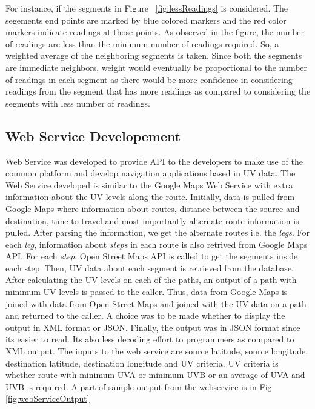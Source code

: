 \documentclass[12pt,fullpage,doublespace]{article}
\begin{document}
For instance, if the segments in Figure ~\ref{fig:lessReadings} is considered. The segements end points are marked by blue colored markers and the red color markers indicate readings at those points. As observed in the figure, the number of readings are less than the minimum number of readings required. So, a weighted average of the neighboring segments is taken. Since both the segments are immediate neighbors, weight would eventually be proportional to the number of readings in each segment as there would be more confidence in considering readings from the segment that has more readings as compared to considering the segments with less number of readings. 

\newpage
\subsection{Web Service Developement}
Web Service was developed to provide API to the developers to make use of the common platform and develop navigation applications based in UV data. The Web Service developed is similar to the Google Maps Web Service \cite{googleWebService} with extra information about the UV levels along the route. Initially, data is pulled from Google Maps where information about routes, distance between the source and destination, time to travel and most importantly alternate route information is pulled. After parsing the information, we get the alternate routes i.e. the {\it legs}. For each {\it leg}, information about {\it steps} in each route is also retrived from Google Maps API. For each {\it step}, Open Street Maps API is called to get the segments inside each step. Then, UV data about each segment is retrieved from the database. After calculating the UV levels on each of the paths, an output of a path with minimum UV levels is passed to the caller. Thus, data from Google Maps is joined with data from Open Street Maps and joined with the UV data on a path and returned to the caller. A choice was to be made whether to display the output in XML format or JSON. Finally, the output was in JSON format since its easier to read. Its also less decoding effort to programmers as compared to XML output. The inputs to the web service are source latitude, source longitude, destination latitude, destination longitude and UV criteria. UV criteria is whether route with minimum UVA or minimum UVB or an average of UVA and UVB is required. A part of sample output from the webservice is in Fig 
\ref{fig:webServiceOutput}
\end{document}

